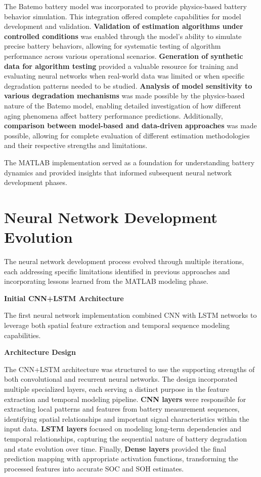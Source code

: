 The Batemo battery model was incorporated to provide physics-based battery behavior simulation. This integration offered complete capabilities for model development and validation. \textbf{Validation of estimation algorithms under controlled conditions} was enabled through the model's ability to simulate precise battery behaviors, allowing for systematic testing of algorithm performance across various operational scenarios. \textbf{Generation of synthetic data for algorithm testing} provided a valuable resource for training and evaluating neural networks when real-world data was limited or when specific degradation patterns needed to be studied. \textbf{Analysis of model sensitivity to various degradation mechanisms} was made possible by the physics-based nature of the Batemo model, enabling detailed investigation of how different aging phenomena affect battery performance predictions. Additionally, \textbf{comparison between model-based and data-driven approaches} was made possible, allowing for complete evaluation of different estimation methodologies and their respective strengths and limitations.

The MATLAB implementation served as a foundation for understanding battery dynamics and provided insights that informed subsequent neural network development phases.

\section{Neural Network Development Evolution}
\label{sec:neural_network_evolution}

The neural network development process evolved through multiple iterations, each addressing specific limitations identified in previous approaches and incorporating lessons learned from the MATLAB modeling phase.

\textbf{Initial CNN+LSTM Architecture}
\label{subsec:cnn_lstm_architecture}

The first neural network implementation combined CNN with LSTM networks to leverage both spatial feature extraction and temporal sequence modeling capabilities.

\textbf{Architecture Design}

The CNN+LSTM architecture was structured to use the supporting strengths of both convolutional and recurrent neural networks. The design incorporated multiple specialized layers, each serving a distinct purpose in the feature extraction and temporal modeling pipeline. \textbf{CNN layers} were responsible for extracting local patterns and features from battery measurement sequences, identifying spatial relationships and important signal characteristics within the input data. \textbf{LSTM layers} focused on modeling long-term dependencies and temporal relationships, capturing the sequential nature of battery degradation and state evolution over time. Finally, \textbf{Dense layers} provided the final prediction mapping with appropriate activation functions, transforming the processed features into accurate SOC and SOH estimates.

